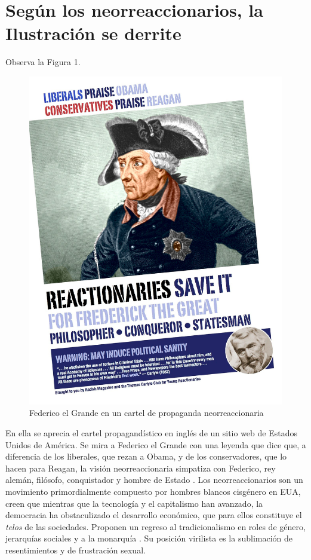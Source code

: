 \section{Según los neorreaccionarios, la Ilustración se derrite}
\label{sec:según-los-neorreaccionarios}

Observa la Figura 1.

\begin{figure}[!ht]
  \centering
  \includegraphics[width=0.7\linewidth]{images/carlyle-neorreactionaries.png}
  \caption{Federico el Grande en un cartel de propaganda neorreaccionaria}
  \label{fig:federico}
\end{figure}

En ella se aprecia el cartel propagandístico en inglés de un sitio web de Estados Unidos de América. Se mira a Federico el Grande con una leyenda que dice que, a diferencia de los liberales, que rezan a Obama, y de los conservadores, que lo hacen para Reagan, la visión neorreaccionaria simpatiza con Federico, rey alemán, filósofo, conquistador y hombre de Estado \autocite{huiUnhappyConsciousnessNeoreactionaries2017}. Los neorreaccionarios son un movimiento primordialmente compuesto por hombres blancos cisgénero en EUA, creen que mientras que la tecnología y el capitalismo han avanzado, la democracia ha obstaculizado el desarrollo económico, que para ellos constituye el \emph{telos} de las sociedades. Proponen un regreso al tradicionalismo en roles de género, jerarquías sociales y a la monarquía \autocite{AskphilosophyWhatNeoreactionarism}. Su posición virilista es la sublimación de resentimientos y de frustración sexual.

